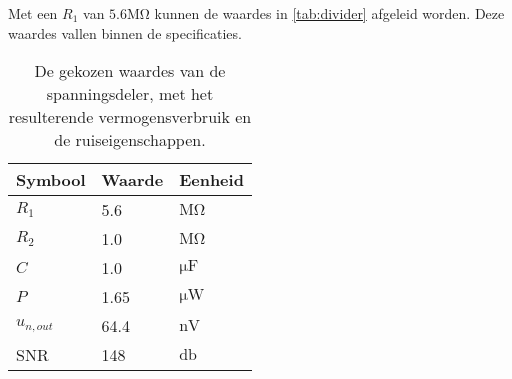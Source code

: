 Met een $R_1$ van $5.6\si{\mega\ohm}$ kunnen de waardes in \autoref{tab:divider} afgeleid worden. Deze waardes vallen binnen de specificaties.

\begin{table}[ht]
\centering
\begin{tabular}{l|l|l}
    Symbool & Waarde & Eenheid \\
    \hline
    $R_1$       & 5.6  & $\si{\mega\ohm}$   \\
    $R_2$       & 1.0  & $\si{\mega\ohm}$   \\
    $C$         & 1.0  & $\si{\micro\farad}$\\
    $P$         & 1.65 & $\si{\micro\watt}$ \\
    $u_{n,out}$ & 64.4 & $\si{\nano\volt}$  \\
    SNR         & 148  & $\si{\decibel}$
\end{tabular}
\caption{De gekozen waardes van de spanningsdeler, met het resulterende vermogensverbruik en de ruiseigenschappen.}
\label{tab:divider}
\end{table}




